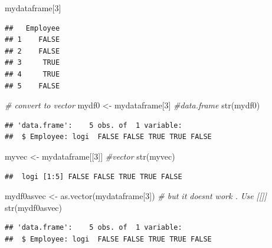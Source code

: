 \documentclass[
]{book}
\newenvironment{Shaded}{\begin{snugshade}}{\end{snugshade}}
\newcommand{\CommentTok}[1]{\textcolor[rgb]{0.56,0.35,0.01}{\textit{#1}}}
\newcommand{\DecValTok}[1]{\textcolor[rgb]{0.00,0.00,0.81}{#1}}
\newcommand{\FunctionTok}[1]{\textcolor[rgb]{0.00,0.00,0.00}{#1}}
\newcommand{\NormalTok}[1]{#1}
\newcommand{\OtherTok}[1]{\textcolor[rgb]{0.56,0.35,0.01}{#1}}
\begin{document}
\begin{Shaded}
\begin{Highlighting}[]
\NormalTok{mydataframe[}\DecValTok{3}\NormalTok{]}
\end{Highlighting}
\end{Shaded}

\begin{verbatim}
##   Employee
## 1    FALSE
## 2    FALSE
## 3     TRUE
## 4     TRUE
## 5    FALSE
\end{verbatim}

\begin{Shaded}
\begin{Highlighting}[]
\CommentTok{\# convert to vector}
\NormalTok{mydf0 }\OtherTok{\textless{}{-}}\NormalTok{ mydataframe[}\DecValTok{3}\NormalTok{] }\CommentTok{\#data.frame}
\FunctionTok{str}\NormalTok{(mydf0)}
\end{Highlighting}
\end{Shaded}

\begin{verbatim}
## 'data.frame':    5 obs. of  1 variable:
##  $ Employee: logi  FALSE FALSE TRUE TRUE FALSE
\end{verbatim}

\begin{Shaded}
\begin{Highlighting}[]
\NormalTok{myvec }\OtherTok{\textless{}{-}}\NormalTok{ mydataframe[[}\DecValTok{3}\NormalTok{]]  }\CommentTok{\#vector}
\FunctionTok{str}\NormalTok{(myvec)}
\end{Highlighting}
\end{Shaded}

\begin{verbatim}
##  logi [1:5] FALSE FALSE TRUE TRUE FALSE
\end{verbatim}

\begin{Shaded}
\begin{Highlighting}[]
\NormalTok{mydf0asvec }\OtherTok{\textless{}{-}} \FunctionTok{as.vector}\NormalTok{(mydataframe[}\DecValTok{3}\NormalTok{]) }\CommentTok{\# but it doesn\textquotesingle{}t work . Use [[]]}
\FunctionTok{str}\NormalTok{(mydf0asvec)}
\end{Highlighting}
\end{Shaded}

\begin{verbatim}
## 'data.frame':    5 obs. of  1 variable:
##  $ Employee: logi  FALSE FALSE TRUE TRUE FALSE
\end{verbatim}
\end{document}
